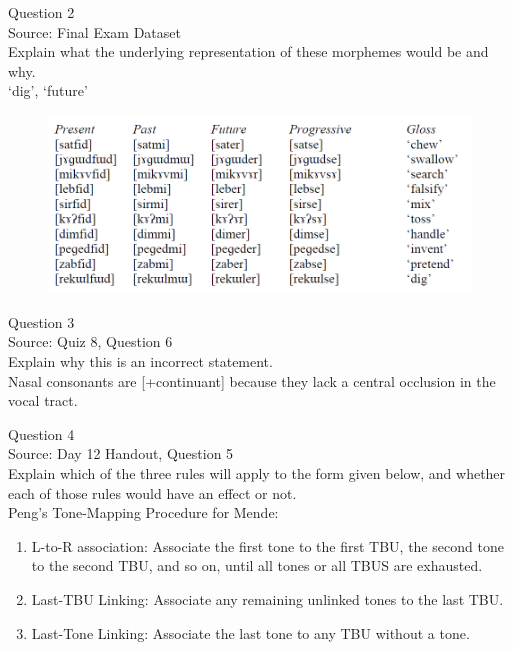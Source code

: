 \documentclass[12pt]{article}
\begin{document}
\newpage

{\large Question 2}\\

Source: Final Exam Dataset\\

Explain what the underlying representation of these morphemes would be and why.\\

`dig', `future'

\begin{figure}[H]
\includegraphics{../images/final_dataset.png}
\end{figure}

\newpage

{\large Question 3}\\

Source: Quiz 8, Question 6\\

Explain why this is an incorrect statement.\\

Nasal consonants are {[+continuant]} because they lack a central occlusion in the vocal tract.


\newpage

{\large Question 4}\\

Source: Day 12 Handout, Question 5\\

Explain which of the three rules will apply to the form given below, and whether each of those rules would have an effect or not.\\

Peng’s Tone-Mapping Procedure for Mende: \begin{enumerate} \item L-to-R association: Associate the first tone to the first TBU, the second tone to the second TBU, and so on, until all tones or all TBUS are exhausted. \item Last-TBU Linking: Associate any remaining unlinked tones to the last TBU. \item Last-Tone Linking: Associate the last tone to any TBU without a tone. \end{enumerate}
\end{document}
